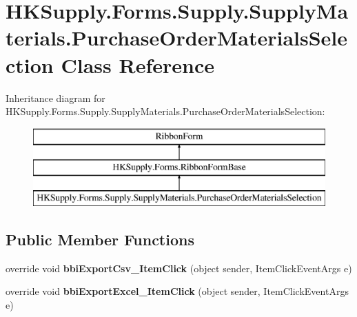 \hypertarget{class_h_k_supply_1_1_forms_1_1_supply_1_1_supply_materials_1_1_purchase_order_materials_selection}{}\section{H\+K\+Supply.\+Forms.\+Supply.\+Supply\+Materials.\+Purchase\+Order\+Materials\+Selection Class Reference}
\label{class_h_k_supply_1_1_forms_1_1_supply_1_1_supply_materials_1_1_purchase_order_materials_selection}
Inheritance diagram for H\+K\+Supply.\+Forms.\+Supply.\+Supply\+Materials.\+Purchase\+Order\+Materials\+Selection\+:\begin{figure}[H]
\begin{center}
\leavevmode
\includegraphics[height=3.000000cm]{class_h_k_supply_1_1_forms_1_1_supply_1_1_supply_materials_1_1_purchase_order_materials_selection}
\end{center}
\end{figure}
\subsection*{Public Member Functions}
\begin{DoxyCompactItemize}
\item 
\mbox{\label{class_h_k_supply_1_1_forms_1_1_supply_1_1_supply_materials_1_1_purchase_order_materials_selection_aeab7ab5f49edf33b4e0ee8726bd9bcad}} 
override void {\bfseries bbi\+Export\+Csv\+\_\+\+Item\+Click} (object sender, Item\+Click\+Event\+Args e)
\item 
\mbox{\label{class_h_k_supply_1_1_forms_1_1_supply_1_1_supply_materials_1_1_purchase_order_materials_selection_a8ccada6666e59862230f18386d6765c6}} 
override void {\bfseries bbi\+Export\+Excel\+\_\+\+Item\+Click} (object sender, Item\+Click\+Event\+Args e)
\end{DoxyCompactItemize}
